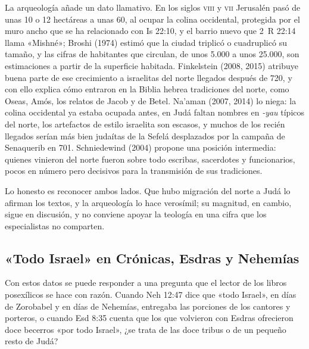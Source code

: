 \documentclass[11pt,letterpaper]{article}
\begin{document}
La arqueología añade un dato llamativo. En los siglos \textsc{viii} y \textsc{vii} Jerusalén pasó de unas 10 o 12 hectáreas a unas 60, al ocupar la colina occidental, protegida por el muro ancho que se ha relacionado con Is 22:10, y el barrio nuevo que 2~R 22:14 llama «Mishné»; Broshi (1974) estimó que la ciudad triplicó o cuadruplicó su tamaño, y las cifras de habitantes que circulan, de unos 5.000 a unos 25.000, son estimaciones a partir de la superficie habitada. Finkelstein (2008, 2015) atribuye buena parte de ese crecimiento a israelitas del norte llegados después de 720, y con ello explica cómo entraron en la Biblia hebrea tradiciones del norte, como Oseas, Amós, los relatos de Jacob y de Betel. Na'aman (2007, 2014) lo niega: la colina occidental ya estaba ocupada antes, en Judá faltan nombres en \emph{-yau} típicos del norte, los artefactos de estilo israelita son escasos, y muchos de los recién llegados serían más bien judaítas de la Sefelá desplazados por la campaña de Senaquerib en 701. Schniedewind (2004) propone una posición intermedia: quienes vinieron del norte fueron sobre todo escribas, sacerdotes y funcionarios, pocos en número pero decisivos para la transmisión de sus tradiciones.

Lo honesto es reconocer ambos lados. Que hubo migración del norte a Judá lo afirman los textos, y la arqueología lo hace verosímil; su magnitud, en cambio, sigue en discusión, y no conviene apoyar la teología en una cifra que los especialistas no comparten.

\subsection{«Todo Israel» en Crónicas, Esdras y Nehemías}
Con estos datos se puede responder a una pregunta que el lector de los libros posexílicos se hace con razón. Cuando Neh 12:47 dice que «todo Israel», en días de Zorobabel y en días de Nehemías, entregaba las porciones de los cantores y porteros, o cuando Esd 8:35 cuenta que los que volvieron con Esdras ofrecieron doce becerros «por todo Israel», ¿se trata de las doce tribus o de un pequeño resto de Judá?
\end{document}
